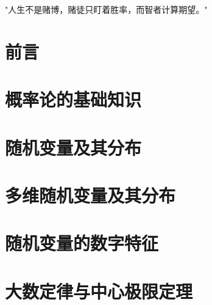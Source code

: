 \documentclass[11pt,a4paper,openany]{book}
\newcommand{\notebody}{
	\chapter*{前言}
	

	\chapter{概率论的基础知识}
	
	\chapter{随机变量及其分布}
	
	\chapter{多维随机变量及其分布}
	
	\chapter{随机变量的数字特征}
	
	\chapter{大数定律与中心极限定理}
	
}
\begin{document}
	

	\newpage

	\thispagestyle{empty}
	\vspace*{\fill}
	\begin{center}
		{\kaishu\fontsize{18}{28}\selectfont "人生不是赌博，赌徒只盯着胜率，而智者计算期望。"}
	\end{center}
	\vfill
	\newpage

	\setcounter{tocdepth}{2}

	\tableofcontents

	\setcounter{page}{0}
	\thispagestyle{empty}
	\newpage
	\notebody
\end{document}
